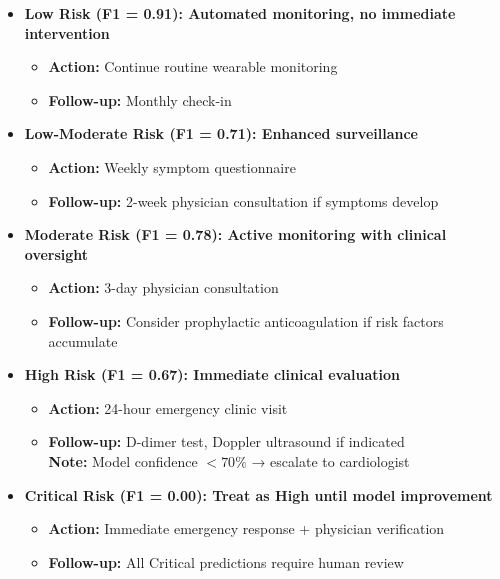 \documentclass[3p,times,procedia]{elsarticle}
\begin{document}
\begin{itemize}

    \item \textbf{Low Risk (F1 = 0.91): Automated monitoring, no immediate intervention}
    \begin{itemize}
        \item \textbf{Action:} Continue routine wearable monitoring
        \item \textbf{Follow-up:} Monthly check-in
    \end{itemize}

    \item \textbf{Low-Moderate Risk (F1 = 0.71): Enhanced surveillance}
    \begin{itemize}
        \item \textbf{Action:} Weekly symptom questionnaire
        \item \textbf{Follow-up:} 2-week physician consultation if symptoms develop
    \end{itemize}

    \item \textbf{Moderate Risk (F1 = 0.78): Active monitoring with clinical oversight}
    \begin{itemize}
        \item \textbf{Action:} 3-day physician consultation
        \item \textbf{Follow-up:} Consider prophylactic anticoagulation if risk factors accumulate
    \end{itemize}

    \item \textbf{High Risk (F1 = 0.67): Immediate clinical evaluation}
    \begin{itemize}
        \item \textbf{Action:} 24-hour emergency clinic visit
        \item \textbf{Follow-up:} D-dimer test, Doppler ultrasound if indicated \\
              \textbf{Note:} Model confidence $<70\%$ → escalate to cardiologist
    \end{itemize}

    \item \textbf{Critical Risk (F1 = 0.00): Treat as High until model improvement}
    \begin{itemize}
        \item \textbf{Action:} Immediate emergency response + physician verification
        \item \textbf{Follow-up:} All Critical predictions require human review
    \end{itemize}

\end{itemize}
\end{document}
